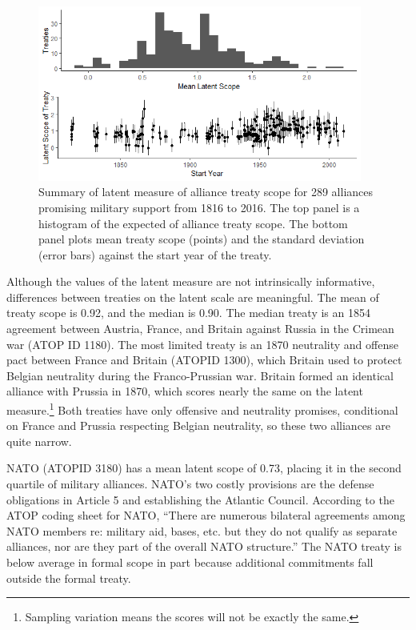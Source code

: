 \documentclass[12pt]{article}
\begin{document}
\begin{figure}
	\centering
		\includegraphics[width=0.95\textwidth]{../figures/ls-summary.png}
	\caption{Summary of latent measure of alliance treaty scope for 289 alliances promising military support from 1816 to 2016. The top panel is a histogram of the expected of alliance treaty scope. The bottom panel plots mean treaty scope (points) and the standard deviation (error bars) against the start year of the treaty.}
	\label{fig:ls-summary}
\end{figure}


Although the values of the latent measure are not intrinsically informative, differences between treaties on the latent scale are meaningful. 
The mean of treaty scope is 0.92, and the median is 0.90. 
The median treaty is an 1854 agreement between Austria, France, and Britain against Russia in the Crimean war (ATOP ID 1180). 
The most limited treaty is an 1870 neutrality and offense pact between France and Britain (ATOPID 1300), which Britain used to protect Belgian neutrality during the Franco-Prussian war.  
Britain formed an identical alliance with Prussia in 1870, which scores nearly the same on the latent measure.\footnote{
Sampling variation means the scores will not be exactly the same.} 
Both treaties have only offensive and neutrality promises, conditional on France and Prussia respecting Belgian neutrality, so these two alliances are quite narrow. 


NATO (ATOPID 3180) has a mean latent scope of 0.73, placing it in the second quartile of military alliances. 
NATO's two costly provisions are the defense obligations in Article 5 and establishing the Atlantic Council. 
According to the ATOP coding sheet for NATO, ``There are numerous bilateral agreements among NATO members re: military aid, bases, etc. but they do not qualify as separate alliances, nor are they part of the overall NATO structure.''
The NATO treaty is below average in formal scope in part because additional commitments fall outside the formal treaty.    
\end{document}
